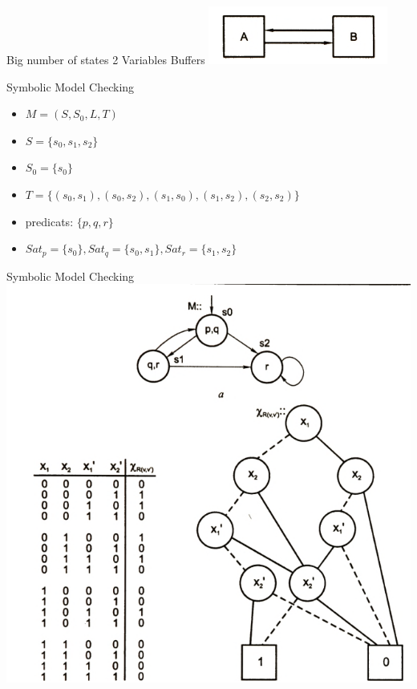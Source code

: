 \documentclass{beamer}
\begin{document}
\begin{frame}{Big number of states}
2 Variables Buffers\newline
\includegraphics[scale=0.5]{ex1.png}
\end{frame}

\begin{frame}{Symbolic Model Checking}
\begin{itemize}
\item $M = (S, S_0, L, T)$
\item $S = \{s_0, s_1, s_2\}$
\item $S_0 = \{s_0\}$
\item $T = \{(s_0, s_1), (s_0, s_2), (s_1, s_0), (s_1, s_2), (s_2, s_2)\}$
\item predicats: $\{p, q, r\}$
\item $Sat_p = \{s_0\}, Sat_q = \{s_0, s_1\}, Sat_r = \{s_1, s_2\}$
\end{itemize}
\end{frame}

\begin{frame}{Symbolic Model Checking}
\includegraphics[scale=0.35]{smb_ex.png}
\end{frame}
\end{document}
